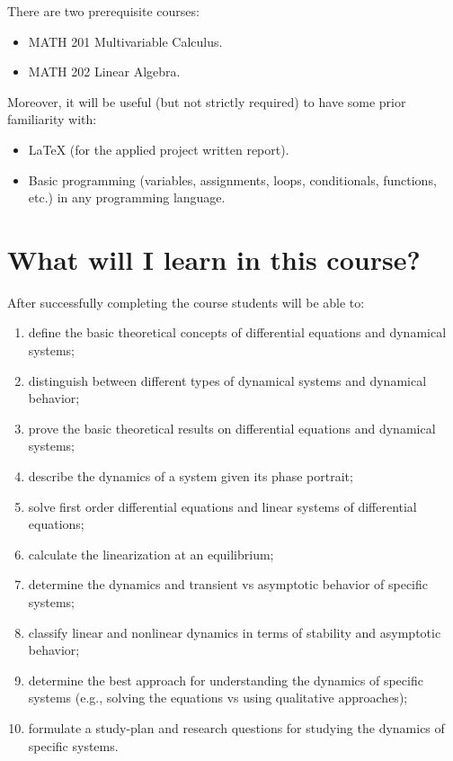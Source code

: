 \documentclass[11pt]{article}
\begin{document}
There are two prerequisite courses:
\begin{itemize}[label={-},noitemsep]
\item MATH 201 Multivariable Calculus.
\item MATH 202 Linear Algebra.
\end{itemize}

Moreover, it will be useful (but not strictly required) to have some prior familiarity with:
\begin{itemize}[label={-},noitemsep]
\item LaTeX (for the applied project written report).
\item Basic programming (variables, assignments, loops, conditionals, functions, etc.) in any programming language.
\end{itemize}


\section{What will I learn in this course?}

After successfully completing the course students will be able to:

\begin{enumerate}[label={\arabic*.},noitemsep]
\item define the basic theoretical concepts of differential equations and dynamical systems;
\item distinguish between different types of dynamical systems and dynamical behavior;
\item prove the basic theoretical results on differential equations and dynamical systems;
\item describe the dynamics of a system given its phase portrait;
\item solve first order differential equations and linear systems of differential equations;
\item calculate the linearization at an equilibrium;
\item determine the dynamics and transient vs asymptotic behavior of specific systems;
\item classify linear and nonlinear dynamics in terms of stability and asymptotic behavior;
\item determine the best approach for understanding the dynamics of specific systems (e.g., solving the equations vs using qualitative approaches);
\item formulate a study-plan and research questions for studying the dynamics of specific systems.
\end{enumerate}
\end{document}
